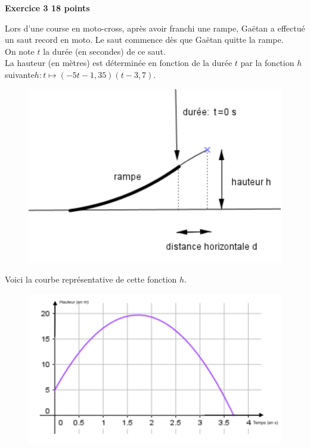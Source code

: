 \documentclass[11pt]{article}
\begin{document}
\newpage
 \textbf{\large{}Exercice 3   \hfill 18 points}
 

Lors d'une course en moto-cross, après avoir franchi une rampe, Gaëtan
a effectué un saut record en moto. Le saut commence dès que Gaëtan quitte la rampe. \\ On note $t$ la durée (en secondes) de ce saut. \\
La hauteur (en mètres) est déterminée en fonction de la durée $t$ par la fonction $h$ suivante\newline $h\colon t \mapsto (-5t -1,35)(t-3,7)$. \\
\begin{figure}[H]
\includegraphics[scale=0.3]{Exo32.png}
\end{figure}
Voici la courbe représentative de cette fonction $h$. 
\begin{figure}[H]
\center
\includegraphics[scale=0.4]{Exo31.png}
\end{figure}
\end{document}

